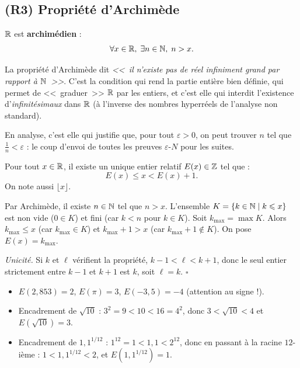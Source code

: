 \subsection{(R3) Propriété d'Archimède}

\begin{thmbox}
$\mathbb{R}$ est \textbf{archimédien} :
\[
  \forall x \in \mathbb{R},\; \exists n \in \mathbb{N},\; n > x.
\]
\end{thmbox}

\begin{intuitionbox}
La propriété d'Archimède dit \emph{<<~il n'existe pas de réel infiniment grand par rapport à $\mathbb{N}$~>>}. C'est la condition qui rend la partie entière bien définie, qui permet de <<~graduer~>> $\mathbb{R}$ par les entiers, et c'est elle qui interdit l'existence d'\emph{infinitésimaux} dans $\mathbb{R}$ (à l'inverse des nombres hyperréels de l'analyse non standard).

En analyse, c'est elle qui justifie que, pour tout $\varepsilon > 0$, on peut trouver $n$ tel que $\frac{1}{n} < \varepsilon$ : le coup d'envoi de toutes les preuves $\varepsilon$-$N$ pour les suites.
\end{intuitionbox}

\begin{propbox}
Pour tout $x \in \mathbb{R}$, il existe un unique entier relatif $E(x) \in \mathbb{Z}$ tel que :
\[
  E(x) \leqslant x < E(x) + 1.
\]
On note aussi $\lfloor x \rfloor$.
\end{propbox}

\begin{proofbox}
Par Archimède, il existe $n \in \mathbb{N}$ tel que $n > x$. L'ensemble $K = \{ k \in \mathbb{N} \mid k \leqslant x \}$ est non vide ($0 \in K$) et fini (car $k < n$ pour $k \in K$). Soit $k_{\max} = \max K$. Alors $k_{\max} \leqslant x$ (car $k_{\max} \in K$) et $k_{\max} + 1 > x$ (car $k_{\max} + 1 \notin K$). On pose $E(x) = k_{\max}$.

\textit{Unicité.} Si $k$ et $\ell$ vérifient la propriété, $k - 1 < \ell < k + 1$, donc le seul entier strictement entre $k-1$ et $k+1$ est $k$, soit $\ell = k$. \hfill$\square$
\end{proofbox}

\begin{exbox}[Encadrements]
\begin{itemize}[leftmargin=1cm]
  \item $E(2{,}853) = 2$, $E(\pi) = 3$, $E(-3{,}5) = -4$ (attention au signe !).
  \item Encadrement de $\sqrt{10}$ : $3^2 = 9 < 10 < 16 = 4^2$, donc $3 < \sqrt{10} < 4$ et $E(\sqrt{10}) = 3$.
  \item Encadrement de $1{,}1^{1/12}$ : $1^{12} = 1 < 1{,}1 < 2^{12}$, donc en passant à la racine $12$-ième : $1 < 1{,}1^{1/12} < 2$, et $E(1{,}1^{1/12}) = 1$.
\end{itemize}
\end{exbox}

